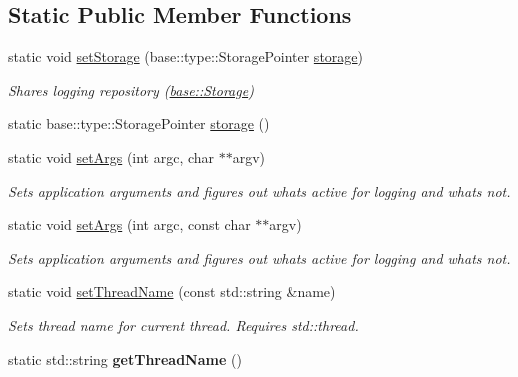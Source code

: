 \subsection*{Static Public Member Functions}
\begin{DoxyCompactItemize}
\item 
\hypertarget{classel_1_1Helpers_af78fd39725281e3dddd7c0fbdc14f11f}{static void \hyperlink{classel_1_1Helpers_af78fd39725281e3dddd7c0fbdc14f11f}{set\-Storage} (base\-::type\-::\-Storage\-Pointer \hyperlink{classel_1_1Helpers_a13a5365de36b3af27660cf9b358829d3}{storage})}\label{classel_1_1Helpers_af78fd39725281e3dddd7c0fbdc14f11f}

\begin{DoxyCompactList}\small\item\em Shares logging repository (\hyperlink{classel_1_1base_1_1Storage}{base\-::\-Storage}) \end{DoxyCompactList}\item 
static base\-::type\-::\-Storage\-Pointer \hyperlink{classel_1_1Helpers_a13a5365de36b3af27660cf9b358829d3}{storage} ()
\item 
\hypertarget{classel_1_1Helpers_a68748f618a0c2840b96dc12532b09bf0}{static void \hyperlink{classel_1_1Helpers_a68748f618a0c2840b96dc12532b09bf0}{set\-Args} (int argc, char $\ast$$\ast$argv)}\label{classel_1_1Helpers_a68748f618a0c2840b96dc12532b09bf0}

\begin{DoxyCompactList}\small\item\em Sets application arguments and figures out whats active for logging and whats not. \end{DoxyCompactList}\item 
static void \hyperlink{classel_1_1Helpers_afac7a023e2c13a62d0295cf0239eb848}{set\-Args} (int argc, const char $\ast$$\ast$argv)
\begin{DoxyCompactList}\small\item\em Sets application arguments and figures out whats active for logging and whats not. \end{DoxyCompactList}\item 
\hypertarget{classel_1_1Helpers_a315250270334214c2749398feba08863}{static void \hyperlink{classel_1_1Helpers_a315250270334214c2749398feba08863}{set\-Thread\-Name} (const std\-::string \&name)}\label{classel_1_1Helpers_a315250270334214c2749398feba08863}

\begin{DoxyCompactList}\small\item\em Sets thread name for current thread. Requires std\-::thread. \end{DoxyCompactList}\item 
\hypertarget{classel_1_1Helpers_ae19cb3baa6d8081a9e922736a384f70b}{static std\-::string {\bfseries get\-Thread\-Name} ()}\label{classel_1_1Helpers_ae19cb3baa6d8081a9e922736a384f70b}


\end{DoxyCompactItemize}
